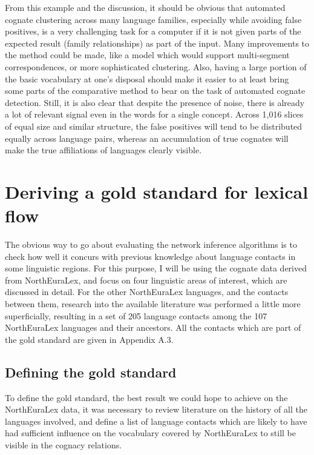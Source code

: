 From this example and the discussion, it should be obvious that automated cognate clustering across many language families, especially while avoiding false positives, is a very challenging task for a computer if it is not given parts of the expected result (family relationships) as part of the input. Many improvements to the method could be made, like a model which would support multi-segment correspondences, or more sophisticated clustering. Also, having a large portion of the basic vocabulary at one's disposal should make it easier to at least bring some parts of the comparative method to bear on the task of automated cognate detection. Still, it is also clear that despite the presence of noise, there is already a lot of relevant signal even in the words for a single concept. Across 1,016 slices of equal size and similar structure, the false positives will tend to be distributed equally across language pairs, whereas an accumulation of true cognates will make the true affiliations of languages clearly 
visible.

\section{Deriving a gold standard for lexical flow}\label{sec:4.6}
The obvious way to go about evaluating the network inference algorithms is to check how well it concurs with previous knowledge about language contacts in some linguistic regions. For this purpose, I will be using the cognate data derived from NorthEuraLex, and focus on four linguistic areas of interest, which are discussed in detail. For the other NorthEuraLex languages, and the contacts between them, research into the available literature was performed a little more superficially, resulting in a set of 205 language contacts among the 107 NorthEuraLex languages and their ancestors. All the contacts which are part of the gold standard are given in Appendix A.3.

\subsection{Defining the gold standard}
To define the gold standard, the best result we could hope to achieve on the NorthEuraLex data, it was necessary to review literature on the history of all the languages involved, and define a list of language contacts which are likely to have had sufficient influence on the vocabulary covered by NorthEuraLex to still be visible in the cognacy relations.

